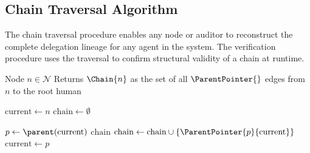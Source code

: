 \subsection{Chain Traversal Algorithm}
\label{sec:chain-traversal-algorithm}

The chain traversal procedure enables any node or auditor to reconstruct the complete delegation lineage for any agent in the system. The verification procedure uses the traversal to confirm structural validity of a chain at runtime.

\medskip
\begin{algorithm}[H]
\caption{Chain-Traverse($n$)}
\label{alg:chain-traverse}
\begin{algorithmic}
\REQUIRE Node $n \in \mathcal{N}$
\ENSURE Returns $\Chain{n}$ as the set of all $\ParentPointer{}$ edges from $n$ to the root human

\STATE $\text{current} \gets n$
\STATE $\text{chain} \gets \emptyset$

\LOOP
    \STATE $p \gets \parent(\text{current})$
        \STATE \RETURN $\text{chain}$
    \ENDIF
    \STATE $\text{chain} \gets \text{chain} \cup \{\ParentPointer{p}{\text{current}}\}$
    \STATE $\text{current} \gets p$
\ENDLOOP
\end{algorithmic}
\end{algorithm}

